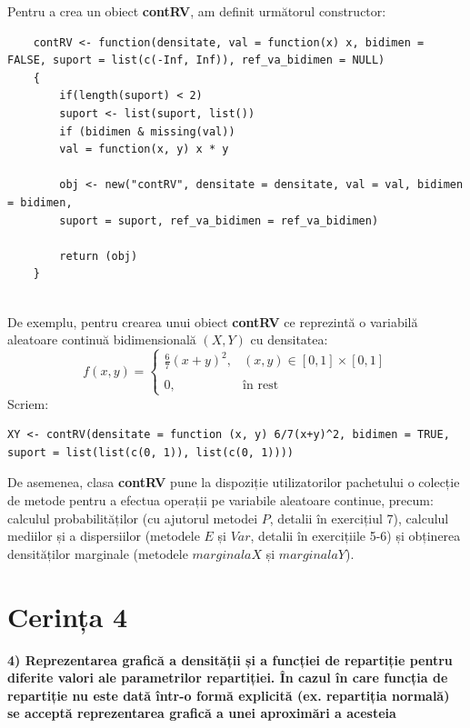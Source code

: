 \documentclass[12pt]{article}
\begin{document}
Pentru a crea un obiect \textbf{contRV}, am definit următorul constructor:
\begin{lstlisting}
	contRV <- function(densitate, val = function(x) x, bidimen = FALSE, suport = list(c(-Inf, Inf)), ref_va_bidimen = NULL)
	{
		if(length(suport) < 2)
		suport <- list(suport, list())
		if (bidimen & missing(val))
		val = function(x, y) x * y
		
		obj <- new("contRV", densitate = densitate, val = val, bidimen = bidimen,
		suport = suport, ref_va_bidimen = ref_va_bidimen)
		
		return (obj)
	}
	
\end{lstlisting}

De exemplu, pentru crearea unui obiect \textbf{contRV} ce reprezintă o variabilă aleatoare continuă bidimensională $(X, Y)$ cu densitatea:
\[ 
f(x, y)= \left\{
\begin{array}{ll}
	\frac{6}{7}(x+y)^2, & (x, y) \in [0, 1] \times [0, 1] \\\\
	0,				   & \text{în rest}
\end{array} 
\right. 
\]
Scriem:
\begin{lstlisting}[numbers=none]
	XY <- contRV(densitate = function (x, y) 6/7(x+y)^2, bidimen = TRUE, suport = list(list(c(0, 1)), list(c(0, 1))))
\end{lstlisting}\vspace*{1\baselineskip}


De asemenea, clasa \textbf{contRV} pune la dispoziție utilizatorilor pachetului o colecție de metode pentru a efectua operații pe variabile aleatoare continue, precum: calculul probabilităților (cu ajutorul metodei $P$, detalii în exercițiul 7), calculul mediilor și a dispersiilor (metodele $E$ și $Var$, detalii în exercițiile 5-6) și obținerea densităților marginale (metodele $marginalaX$ și $marginalaY$). \pagebreak
	\section{Cerința 4}
\textbf{4) Reprezentarea grafică a densității și a funcției de repartiție pentru diferite valori ale
	parametrilor repartiției. În cazul în care funcția de repartiție nu este dată într-o formă
	explicită (ex. repartiția normală) se acceptă reprezentarea grafică a unei aproximări a acesteia}\vspace{5mm}
\end{document}
